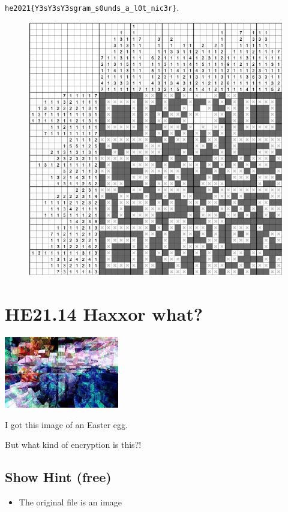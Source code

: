\documentclass[english,a4paper,nols,noindent]{tufte-handout}
\begin{document}
\verb+he2021{Y3sY3sY3sgram_s0unds_a_l0t_nic3r}+.
\begin{figure}
    \includegraphics[width=150mm]{ch13/solution13.png}
\end{figure}

\hypertarget{he21.14}{%
  \section{HE21.14 Haxxor what?}
  \label{he21.14}}
\begin{marginfigure}
    \includegraphics[width=50mm]{images/challenge14.jpg}
\end{marginfigure}

\noindent I got this image of an Easter egg.

But what kind of encryption is this?!

\subsection{Show Hint (free)}
\begin{itemize}
\item The original file is an image
\end{itemize}
\end{document}
